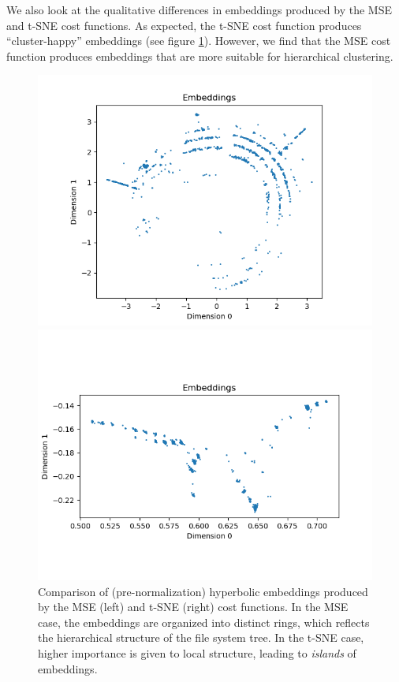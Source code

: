 \documentclass{article}
\begin{document}
We also look at the qualitative differences in embeddings produced by the MSE and t-SNE cost functions. As expected, the t-SNE cost function produces ``cluster-happy'' embeddings (see figure \ref{fig:cost-function-emnbeddings}). However, we find that the MSE cost function produces embeddings that are more suitable for hierarchical clustering.

\begin{figure}[ht]
  \begin{minipage}{0.5\textwidth}
    \centering
    \includegraphics[width=\linewidth]{figures/mse_cost.png}
  \end{minipage}%
  \begin{minipage}{0.5\textwidth}
    \centering
    \includegraphics[width=\linewidth]{figures/tsne_cost.png}
  \end{minipage}
  \caption{Comparison of (pre-normalization) hyperbolic embeddings produced by the MSE (left) and t-SNE (right) cost functions. In the MSE case, the embeddings are organized into distinct rings, which reflects the hierarchical structure of the file system tree. In the t-SNE case, higher importance is given to local structure, leading to \emph{islands} of embeddings.}
  \label{fig:cost-function-emnbeddings}
\end{figure}
\end{document}
